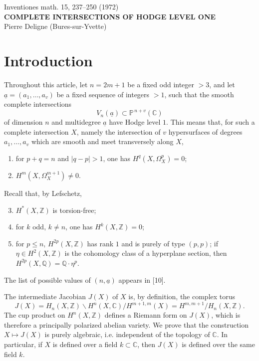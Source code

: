 \documentclass[10pt]{article}
\newcommand{\C}{\mathbb C}
\newcommand{\Pj}{\mathbb P}
\newcommand{\Q}{\mathbb Q}
\newcommand{\Z}{\mathbb Z}
\begin{document}
\begin{center}
{\large Inventiones math. 15, 237--250 (1972)}\\[0.5em]
{\Large\bfseries COMPLETE INTERSECTIONS OF HODGE LEVEL ONE}\\[0.5em]
Pierre Deligne (Bures-sur-Yvette)
\end{center}

\section*{Introduction}

Throughout this article, let \(n=2m+1\) be a fixed odd integer \(>3\), and let \(\underline a=(a_1,\ldots,a_v)\) be a fixed sequence of integers \(>1\), such that the smooth complete intersections
\[
V_n(\underline a)\subset\Pj^{\,n+v}(\C)
\]
of dimension \(n\) and multidegree \(\underline a\) have Hodge level \(1\). This means that, for such a complete intersection \(X\), namely the intersection of \(v\) hypersurfaces of degrees \(a_1,\ldots,a_v\) which are smooth and meet transversely along \(X\),
\begin{enumerate}[label=\alph*)]
\item for \(p+q=n\) and \(|q-p|>1\), one has \(H^q(X,\Omega_X^p)=0\);
\item \(H^m(X,\Omega_X^{m+1})\ne0\).
\end{enumerate}
Recall that, by Lefschetz,
\begin{enumerate}[label=\alph*)]
\setcounter{enumi}{2}
\item \(H^*(X,\Z)\) is torsion-free;
\item for \(k\) odd, \(k\ne n\), one has \(H^k(X,\Z)=0\);
\item for \(p\le n\), \(H^{2p}(X,\Z)\) has rank \(1\) and is purely of type \((p,p)\); if \(\eta\in H^2(X,\Z)\) is the cohomology class of a hyperplane section, then \(H^{2p}(X,\Q)=\Q\cdot\eta^p\).
\end{enumerate}
The list of possible values of \((n,\underline a)\) appears in [10].

The intermediate Jacobian \(J(X)\) of \(X\) is, by definition, the complex torus
\[
J(X)=H_n(X,\Z)\backslash H^n(X,\C)/H^{m+1,m}(X)
      =H^{m,m+1}/H_n(X,\Z).
\]
The cup product on \(H^n(X,\Z)\) defines a Riemann form on \(J(X)\), which is therefore a principally polarized abelian variety. We prove that the construction \(X\mapsto J(X)\) is purely algebraic, i.e. independent of the topology of \(\C\). In particular, if \(X\) is defined over a field \(k\subset\C\), then \(J(X)\) is defined over the same field \(k\).
\end{document}
